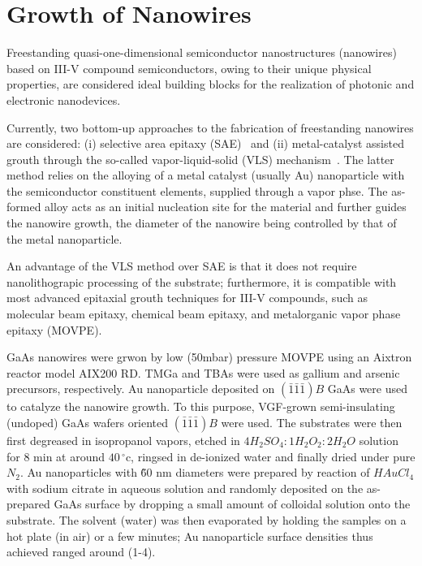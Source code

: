 \section{Growth of Nanowires}

Freestanding quasi-one-dimensional semiconductor nanostructures (nanowires)
based on III-V compound semiconductors, owing to their unique physical
properties, are considered ideal building blocks for the realization of
photonic and electronic nanodevices.

Currently, two bottom-up approaches to the fabrication of freestanding
nanowires are considered: (i) selective area epitaxy
(SAE)~\cite{motohisa2004catalyst} and (ii) metal-catalyst assisted grouth
through the so-called vapor-liquid-solid (VLS) mechanism~\cite{wagner1964vapor,
givargizov1975fundamental}. The latter method relies on the alloying of a metal
catalyst (usually Au) nanoparticle with the semiconductor constituent elements,
supplied through a vapor phse. The as-formed alloy acts as an initial
nucleation site for the material and further guides the nanowire growth, the
diameter of the nanowire being controlled by that of the metal nanoparticle.

An advantage of the VLS method over SAE is that it does not require
nanolithograpic processing of the substrate; furthermore, it is compatible with
most advanced epitaxial grouth techniques for III-V compounds, such as
molecular beam epitaxy, chemical beam epitaxy, and metalorganic vapor phase
epitaxy (MOVPE). 

GaAs nanowires were grwon by low (50mbar) pressure MOVPE using an Aixtron
reactor model AIX200 RD. TMGa and TBAs were used as gallium and arsenic
precursors, respectively. Au nanoparticle deposited on
$(\bar{1}\bar{1}\bar{1})B$ GaAs were used to catalyze the nanowire growth. To
this purpose, VGF-grown semi-insulating (undoped) GaAs wafers oriented
$(\bar{1}\bar{1}\bar{1})B$ were used. The substrates were then first degreased
in isopropanol vapors, etched in $4H_2SO_4:1H_2O_2:2H_2O$ solution for 8 min at
around $40\,^{\circ}\mathrm{c}$, ringsed in de-ionized water and finally dried
under pure $N_2$. Au nanoparticles with \~60 nm diameters were prepared by
reaction of $HAuCl_4$ with sodium citrate in aqueous solution and randomly
deposited on the as-prepared GaAs surface by dropping a small amount of
colloidal solution onto the substrate. The solvent (water) was then evaporated
by holding the samples on a hot plate (in air) or a few minutes; Au
nanoparticle surface densities thus achieved ranged around (1-4). 

